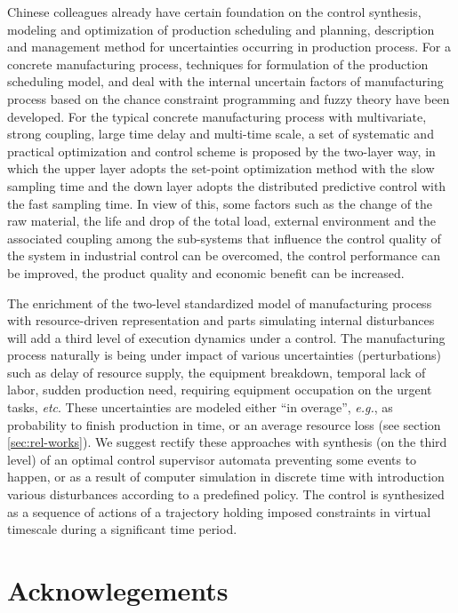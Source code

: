 \documentclass[conference]{IEEEtran}
\begin{document}
Chinese colleagues already have certain foundation on the control synthesis, modeling and optimization of production scheduling and planning, description and management method for uncertainties occurring in production process. For a concrete manufacturing process, techniques for formulation of the production scheduling model, and deal with the internal uncertain factors of manufacturing process based on the chance constraint programming and fuzzy theory \cite{b6} have been developed. For the typical concrete manufacturing process with multivariate, strong coupling, large time delay and multi-time scale, a set of systematic and practical optimization and control scheme is proposed by the two-layer way, in which the upper layer adopts the set-point optimization method with the slow sampling time and the down layer adopts the distributed predictive control with the fast sampling time. In view of this, some factors such as the change of the raw material, the life and drop of the total load, external environment and the associated coupling among the sub-systems that influence the control quality of the system in industrial control can be overcomed, the control performance can be improved, the product quality and economic benefit can be increased.

The enrichment of the two-level standardized model of manufacturing process with resource-driven representation and parts simulating internal disturbances will add a third level of execution dynamics under a control.  The manufacturing process naturally is being under impact of various uncertainties (perturbations) such as delay of resource supply, the equipment breakdown, temporal lack of labor, sudden production need, requiring equipment occupation on the urgent tasks, \emph{etc}. These uncertainties are modeled either “in overage”, \emph{e.g.}, as probability to finish production in time, or an average resource loss (see section \ref{sec:rel-works}).  We suggest rectify these approaches with synthesis (on the third level) of an optimal control supervisor automata preventing some events to happen, or as a result of computer simulation in discrete time with introduction various disturbances according to a predefined policy. The control is synthesized as a sequence of actions of a trajectory holding imposed constraints in virtual timescale during a significant time period.

\section*{Acknowlegements}
\label{sec:ack}
\end{document}
